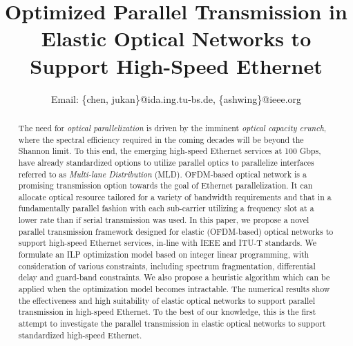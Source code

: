 \documentclass[conference]{IEEEtran}
\begin{document}
   \title{Optimized Parallel Transmission in Elastic Optical Networks to Support High-Speed Ethernet}
   \author{
Email: \{chen, jukan\}@ida.ing.tu-bs.de, \{ashwing\}@ieee.org }
\maketitle

\begin{abstract}  
The need for \emph{optical parallelization} is driven by the imminent \emph{optical capacity crunch}, where the spectral efficiency required in the coming decades will be beyond the Shannon 
limit. To this end,  the emerging high-speed Ethernet services at 100 Gbps, have already standardized options to utilize 
parallel optics to parallelize interfaces referred to as \emph{Multi-lane Distribution} (MLD). OFDM-based optical 
network is a promising transmission option towards the goal of Ethernet parallelization. It can allocate optical 
resource tailored for a variety of bandwidth requirements and that in a fundamentally parallel fashion with each 
sub-carrier utilizing a frequency slot at a lower rate than if serial transmission was used. In this paper, we propose a novel 
parallel transmission framework designed for elastic (OFDM-based) optical networks to support high-speed Ethernet 
services, in-line with  IEEE and ITU-T standards.  We formulate an ILP optimization model based on integer linear 
programming, with consideration of various constraints, including spectrum fragmentation, differential delay and 
guard-band constraints. We also propose a heuristic algorithm which can be applied when the optimization model becomes 
intractable. The numerical results show the effectiveness and high suitability of elastic optical networks to support 
parallel transmission in high-speed Ethernet.  To the best of our knowledge, this is  the first attempt to investigate the parallel 
transmission in elastic optical networks to support standardized high-speed Ethernet.


 \end{abstract}
\end{document}
